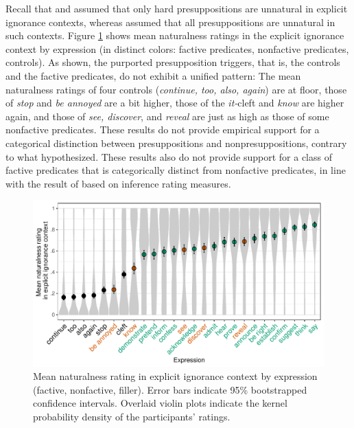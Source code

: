 \documentclass[11pt,fleqn]{article}
\newcommand{\6}{\mbox{$[\hspace*{-.6mm}[$}}
\newcommand{\9}{\mbox{$]\hspace*{-.6mm}]$}}
\begin{document}
Recall that \citealt{simons01} and \citealt{abusch10} assumed that only hard presuppositions are unnatural in explicit ignorance contexts, whereas \citealt{mandelkern-etal2020} assumed that all presuppositions are unnatural in such contexts. Figure \ref{fig:acc-by-expression} shows mean naturalness ratings in the explicit ignorance context by expression (in distinct colors: \color{orange}factive predicates\color{black}, \color{green}nonfactive predicates\color{black},  controls). As shown, the purported presupposition triggers, that is, the controls and the factive predicates, do not exhibit a unified pattern: The mean naturalness ratings of four controls ({\em continue, too, also, again}) are at floor, those of {\em stop} and {\em be annoyed} are a bit higher, those of the {\em it-}cleft and {\em know} are higher again, and those of {\em see, discover}, and {\em reveal} are just as high as those of some nonfactive predicates. These results do not provide empirical support for a categorical distinction between presuppositions and nonpresuppositions, contrary to what \citealt{mandelkern-etal2020} hypothesized. These results also do not provide support for a class of factive predicates that is categorically distinct from nonfactive predicates, in line with the result of \citealt{degen-tonhauser-language} based on inference rating measures. 

\begin{figure}[h!]
\centering
\includegraphics[width=.9\textwidth]{../../results/main/13explicitIgnorance/graphs/explicit-ignorance-naturalness-by-predicate}
\caption{Mean naturalness rating in explicit ignorance context by expression (\color{orange}factive\color{black}, \color{green}nonfactive\color{green}, \color{black}filler\color{black}). Error bars indicate 95\% bootstrapped confidence intervals. Overlaid violin plots indicate the kernel probability density of the participants' ratings.}\label{fig:acc-by-expression}
\end{figure}
\end{document}

